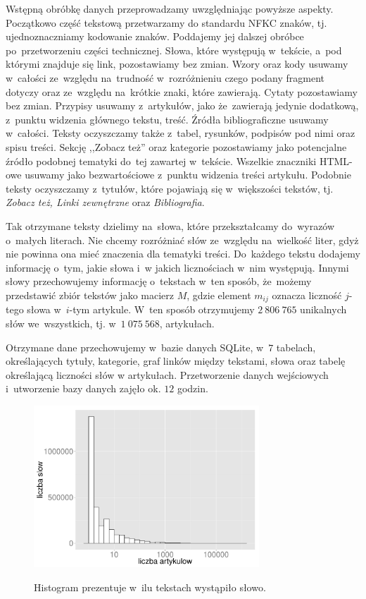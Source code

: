 \documentclass{praca1}
\begin{document}
Wstępną obróbkę danych przeprowadzamy uwzględniając powyższe aspekty. Początkowo część tekstową przetwarzamy do standardu NFKC znaków, tj. ujednoznaczniamy kodowanie znaków. Poddajemy jej dalszej obróbce po~przetworzeniu części technicznej. Słowa, które występują w~tekście, a~pod którymi znajduje się link, pozostawiamy bez zmian. Wzory oraz kody usuwamy w~całości ze~względu na~trudność w~rozróżnieniu czego podany fragment dotyczy oraz ze~względu na~krótkie znaki, które zawierają. Cytaty pozostawiamy bez zmian. Przypisy usuwamy z~artykułów, jako że~zawierają jedynie dodatkową, z~punktu widzenia głównego tekstu, treść. Źródła bibliograficzne usuwamy w~całości. Teksty oczyszczamy także z~tabel, rysunków, podpisów pod nimi oraz spisu treści. Sekcję ,,Zobacz też'' oraz kategorie pozostawiamy jako potencjalne źródło podobnej tematyki do~tej zawartej w~tekście. Wszelkie znaczniki HTML-owe usuwamy jako bezwartościowe z~punktu widzenia treści artykułu. Podobnie teksty oczyszczamy z~tytułów, które pojawiają się w~większości tekstów, tj. \emph{Zobacz też, Linki zewnętrzne} oraz \emph{Bibliografia}. 

Tak otrzymane teksty dzielimy na~słowa, które przekształcamy do~wyrazów o~małych literach. Nie chcemy rozróżniać słów ze~względu na~wielkość liter, gdyż nie powinna ona mieć znaczenia dla tematyki treści. Do~każdego tekstu dodajemy informację o~tym, jakie słowa i~w jakich licznościach w~nim występują. Innymi słowy przechowujemy informację o~tekstach w~ten sposób, że~możemy przedstawić zbiór tekstów jako macierz $M$, gdzie element $m_{ij}$ oznacza liczność $j$-tego słowa w~$i$-tym artykule. W~ten sposób otrzymujemy $2\ 806\ 765$ unikalnych słów we~wszystkich, tj. w~$1\ 075\ 568$, artykułach. 

Otrzymane dane przechowujemy w~bazie danych SQLite, w~$7$ tabelach, określających tytuły, kategorie, graf linków między tekstami, słowa oraz tabelę określającą liczności słów w artykułach. Przetworzenie danych wejściowych i~utworzenie bazy danych zajęło ok. $12$ godzin.

\begin{figure}[!h]
  \centering
  \includegraphics[width=240pt]{plot1.pdf}\\
  \caption{Histogram prezentuje w~ilu tekstach wystąpiło słowo.}\label{plot:001}
\end{figure}
\end{document}
